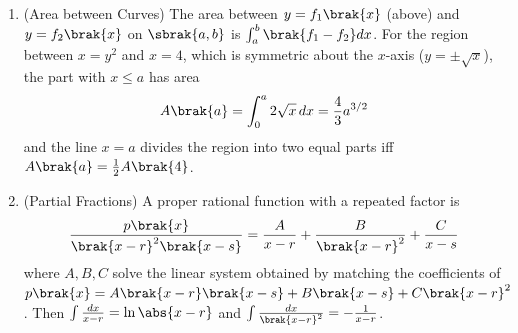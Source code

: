 \begin{enumerate}[label=\thesubsection.\arabic*, ref=\thesubsection.\theenumi,itemsep=1.5em]
\item (Area between Curves) The area between $y=f_1\brak{x}$ (above) and $y=f_2\brak{x}$ on $\sbrak{a,b}$ is $\int_a^b\brak{f_1-f_2}dx$. For the region between $x=y^2$ and $x=4$, which is symmetric about the $x$-axis ($y=\pm\sqrt{x}$), the part with $x\le a$ has area
\begin{align}
A\brak{a} = \int_0^a2\sqrt{x}\,dx = \frac{4}{3}a^{3/2}
\label{eq:EE26BTECH11218-cb12-area}
\end{align}
and the line $x=a$ divides the region into two equal parts iff $A\brak{a}=\frac{1}{2}A\brak{4}$.

\item (Partial Fractions) A proper rational function with a repeated factor is
\begin{align}
\frac{p\brak{x}}{\brak{x-r}^2\brak{x-s}} = \frac{A}{x-r}+\frac{B}{\brak{x-r}^2}+\frac{C}{x-s}
\label{eq:EE26BTECH11218-cb12-partial}
\end{align}
where $A,B,C$ solve the linear system obtained by matching the coefficients of $p\brak{x}=A\brak{x-r}\brak{x-s}+B\brak{x-s}+C\brak{x-r}^2$. Then $\int\frac{dx}{x-r}=\ln\abs{x-r}$ and $\int\frac{dx}{\brak{x-r}^2}=-\frac{1}{x-r}$.
\end{enumerate}
